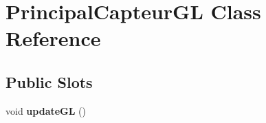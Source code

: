 \hypertarget{class_principal_capteur_g_l}{\section{Principal\-Capteur\-G\-L Class Reference}
\label{class_principal_capteur_g_l}
}
\subsection*{Public Slots}
\begin{DoxyCompactItemize}
\item 
\hypertarget{class_principal_capteur_g_l_a710ab76dbf2da354aa05e801906fb72f}{void {\bfseries update\-G\-L} ()}\label{class_principal_capteur_g_l_a710ab76dbf2da354aa05e801906fb72f}

\end{DoxyCompactItemize}
